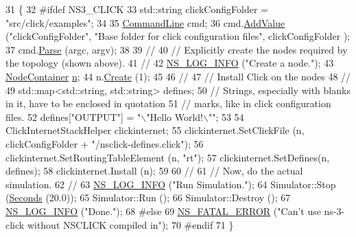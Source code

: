 \begin{DoxyCode}
31 \{
32 \textcolor{preprocessor}{#ifdef NS3\_CLICK}
33   std::string clickConfigFolder = \textcolor{stringliteral}{"src/click/examples"};
34 
35   \hyperlink{classns3_1_1CommandLine}{CommandLine} cmd;
36   cmd.\hyperlink{classns3_1_1CommandLine_addcfb546c7ad4c8bd0965654d55beb8e}{AddValue} (\textcolor{stringliteral}{"clickConfigFolder"}, \textcolor{stringliteral}{"Base folder for click configuration files"}, clickConfigFolder
      );
37   cmd.\hyperlink{classns3_1_1CommandLine_a5c10b85b3207e5ecb48d907966923156}{Parse} (argc, argv);
38 
39 \textcolor{comment}{//}
40 \textcolor{comment}{// Explicitly create the nodes required by the topology (shown above).}
41 \textcolor{comment}{//}
42   \hyperlink{group__logging_gafbd73ee2cf9f26b319f49086d8e860fb}{NS\_LOG\_INFO} (\textcolor{stringliteral}{"Create a node."});
43   \hyperlink{classns3_1_1NodeContainer}{NodeContainer} \hyperlink{namespacesample-rng-plot_aeb5ee5c431e338ef39b7ac5431242e1d}{n};
44   n.\hyperlink{classns3_1_1NodeContainer_a787f059e2813e8b951cc6914d11dfe69}{Create} (1);
45 
46 \textcolor{comment}{//}
47 \textcolor{comment}{// Install Click on the nodes}
48 \textcolor{comment}{//}
49   std::map<std::string, std::string> defines;
50 \textcolor{comment}{// Strings, especially with blanks in it, have to be enclosed in quotation}
51 \textcolor{comment}{// marks, like in click configuration files.}
52   defines[\textcolor{stringliteral}{"OUTPUT"}] = \textcolor{stringliteral}{"\(\backslash\)"Hello World!\(\backslash\)""};
53   
54   ClickInternetStackHelper clickinternet;
55   clickinternet.SetClickFile (n, clickConfigFolder + \textcolor{stringliteral}{"/nsclick-defines.click"});
56   clickinternet.SetRoutingTableElement (n, \textcolor{stringliteral}{"rt"});
57   clickinternet.SetDefines(n, defines);
58   clickinternet.Install (n);
59 
60 \textcolor{comment}{//}
61 \textcolor{comment}{// Now, do the actual simulation.}
62 \textcolor{comment}{//}
63   \hyperlink{group__logging_gafbd73ee2cf9f26b319f49086d8e860fb}{NS\_LOG\_INFO} (\textcolor{stringliteral}{"Run Simulation."});
64   Simulator::Stop (\hyperlink{group__timecivil_ga33c34b816f8ff6628e33d5c8e9713b9e}{Seconds} (20.0));
65   Simulator::Run ();
66   Simulator::Destroy ();
67   \hyperlink{group__logging_gafbd73ee2cf9f26b319f49086d8e860fb}{NS\_LOG\_INFO} (\textcolor{stringliteral}{"Done."});
68 \textcolor{preprocessor}{#else}
69   \hyperlink{group__fatal_ga5131d5e3f75d7d4cbfd706ac456fdc85}{NS\_FATAL\_ERROR} (\textcolor{stringliteral}{"Can't use ns-3-click without NSCLICK compiled in"});
70 \textcolor{preprocessor}{#endif}
71 \}
\end{DoxyCode}


